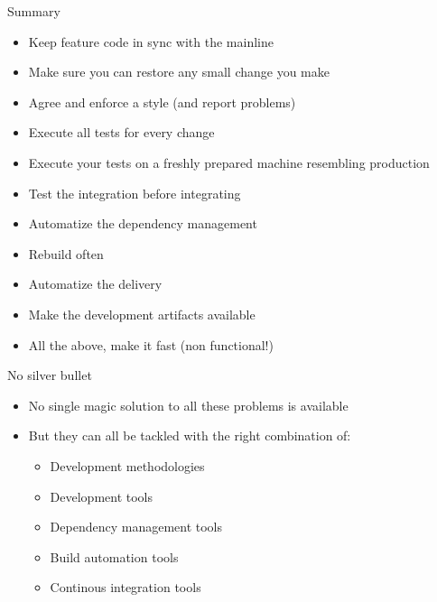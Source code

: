 \documentclass[presentation]{beamer}
\begin{document}
\begin{frame}[fragile]{Summary}
	\begin{itemize}
		\item Keep feature code in sync with the mainline
		\item Make sure you can restore any small change you make
		\item Agree and enforce a style (and report problems)
		\item Execute all tests for every change
		\item Execute your tests on a freshly prepared machine resembling production
		\item Test the integration before integrating
		\item Automatize the dependency management
		\item Rebuild often
		\item Automatize the delivery
		\item Make the development artifacts available
		\item All the above, make it fast (non functional!)
	\end{itemize}
\end{frame}

\begin{frame}[fragile]{No silver bullet}
	\begin{itemize}
		\item No single magic solution to all these problems is available
		\item But they can all be tackled with the right combination of:
		\begin{itemize}
			\item Development methodologies
			\item Development tools
			\item Dependency management tools
			\item Build automation tools
			\item Continous integration tools
		\end{itemize}
	\end{itemize}
\end{frame}
\end{document}
